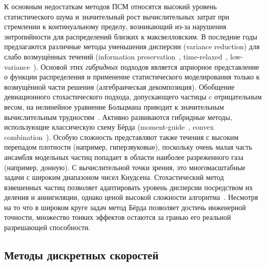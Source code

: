 К основным недостаткам методов ПСМ относятся высокий уровень статистического шума
и значительный рост вычислительных затрат при стремлении к континуальному пределу,
возникающий из-за нарушения энтропийности для распределений близких к максвелловским.
В последние годы предлагаются различные методы уменьшения дисперсии (variance reduction) для слабо возмущённых течений
(information preservation~\cite{Fan2001, Sun2002}, time-relaxed~\cite{Pareschi2001, Pareschi2011},
low-variance~\cite{Hadji2005, Hadji2007, Hadji2011}).
Основой этих \emph{гибридных} подходов является априорное представление о функции распределения
и применение статистического моделирования только к возмущённой части решения (алгебраическая декомпозиция).
Обобщение девиационного стохастического подхода, допускающего частицы c отрицательным весом,
на нелинейное уравнение Больцмана приводит к значительным вычислительным трудностям~\cite{Wagner2008}.
Активно развиваются гибридные методы, использующие классическую схему Бёрда
(moment-guide~\cite{Dimarco2011, Dimarco2013}, convex combination~\cite{Dimarco2008, Caflisch2016}).
Особую сложность представляют также течения с высоким перепадом плотности (например, гиперзвуковые),
поскольку очень малая часть ансамбля модельных частиц попадает в области наиболее разреженного газа (например, донную).
С вычислительной точки зрения, это многомасштабные задачи с широким диапазоном чисел Кнудсена.
Стохастический метод взвешенных частиц позволяет адаптировать уровень дисперсии посредством
их деления и аннигиляции, однако ценой высокой сложности алгоритма~\cite{Rjasanow1996, Rjasanow2005}.
Несмотря на то что в широком круге задач метод Бёрда позволяет достичь инженерной точности,
множество тонких эффектов остаются за гранью его реальной разрешающей способности.

\subsection{Методы дискретных скоростей}

